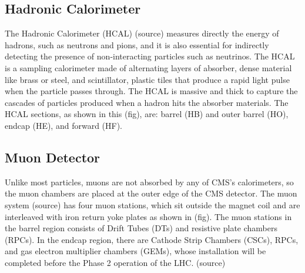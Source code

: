 \subsection{Hadronic Calorimeter}
The Hadronic Calorimeter (HCAL) (source) measures directly the energy of hadrons, such as neutrons and pions, and it is also essential for indirectly detecting the presence of non-interacting particles such as neutrinos.
The HCAL is a sampling calorimeter made of alternating layers of absorber, dense material like brass or steel, and scintillator, plastic tiles that produce a rapid light pulse when the particle passes through.
The HCAL is massive and thick to capture the cascades of particles produced when a hadron hits the absorber materials.
The HCAL sections, as shown in this (fig), are: barrel (HB) and outer barrel (HO), endcap (HE), and forward (HF).

\subsection{Muon Detector}
Unlike most particles, muons are not absorbed by any of CMS’s calorimeters, so the muon chambers are placed at the outer edge of the CMS detector.
The muon system (source) has four muon stations, which sit outside the magnet coil and are interleaved with iron return yoke plates as shown in (fig).
The muon stations in the barrel region consists of Drift Tubes (DTs) and resistive plate chambers (RPCs).
In the endcap region, there are Cathode Strip Chambers (CSCs), RPCs, and gas electron multiplier chambers (GEMs), whose installation will be completed before the Phase 2 operation of the LHC. (source)

